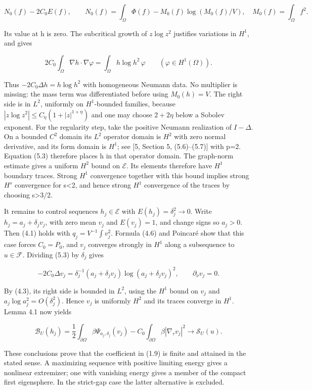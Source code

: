 \documentclass[11pt]{article}
\begin{document}
\[N_0(f)-2C_0E(f),\qquad
N_0(f)=\int_\Omega\Phi(f)-M_0(f)\log(M_0(f)/V),\quad M_0(f)=\int_\Omega f^2.\tag{5.2}\]

Its value at h is zero. The subcritical growth of \(z\log z^2\)
justifies variations in \(H^{1}\), and gives

\[2C_0\int_\Omega\nabla h\cdot\nabla\varphi
=\int_\Omega h\log h^2\,\varphi\qquad(\varphi\in H^1(\Omega)).\tag{5.3}\]

Thus \(-2C_0\Delta h=h\log h^2\) with homogeneous Neumann data. No
multiplier is missing: the mass term was differentiated before using
\(M_0(h)=V\). The right side is in \(L^{2}\), uniformly on
\(H^{1}\)-bounded families, because
\(|z\log z^2|\leq C_\eta(1+|z|^{1+\eta})\) and one may choose
\(2+2\eta\) below a Sobolev exponent. For the regularity step, take the
positive Neumann realization of \(I-\Delta\). On a bounded \(C^{2}\)
domain its \(L^{2}\) operator domain is \(H^{2}\) with zero normal
derivative, and its form domain is \(H^{1}\); see {[}5, Section 5,
(5.6)--(5.7){]} with p=2. Equation (5.3) therefore places h in that
operator domain. The graph-norm estimate gives a uniform \(H^{2}\) bound
on \(\mathcal{E}\). Its elements therefore have \(H^{1}\) boundary
traces. Strong \(H^{1}\) convergence together with this bound implies
strong \(H^s\) convergence for s\textless2, and hence strong \(H^{1}\)
convergence of the traces by choosing s\textgreater3/2.

It remains to control sequences \(h_j\in \mathcal{E}\) with
\(E(h_j)=\delta _j^{2}\to 0\). Write \(h_j=a_j+\delta _jv_j\), with zero
mean \(v_j\) and \(E(v_j)=1\), and change signs so \(a_j>0\). Then (4.1)
holds with \(q_j=V^{-1}\int v_j^{2}\). Formula (4.6) and Poincaré show
that this case forces \(C_0=P_0\), and \(v_j\) converges strongly in
\(H^{1}\) along a subsequence to \(u\in \mathcal{F}\). Dividing (5.3) by
\(\delta _j\) gives

\[-2C_0\Delta v_j=\delta_j^{-1}(a_j+\delta_jv_j)\log(a_j+\delta_jv_j)^2,
\qquad\partial_\nu v_j=0.\tag{5.4}\]

By (4.3), its right side is bounded in \(L^{2}\), using the \(H^{1}\)
bound on \(v_j\) and \(a_j\log a_j^2=O(\delta_j^2)\). Hence \(v_j\) is
uniformly \(H^{2}\) and its traces converge in \(H^{1}\). Lemma 4.1 now
yields

\[\mathcal B_U(h_j)=\frac12\int_{\partial\Omega}\beta\Psi_{a_j,\delta_j}(v_j)
-C_0\int_{\partial\Omega}\beta|\nabla_\tau v_j|^2
\longrightarrow\mathcal S_U(u).\tag{5.5}\]

These conclusions prove that the coefficient in (1.9) is finite and
attained in the stated sense. A maximizing sequence with positive
limiting energy gives a nonlinear extremizer; one with vanishing energy
gives a member of the compact first eigensphere. In the strict-gap case
the latter alternative is excluded.
\end{document}
